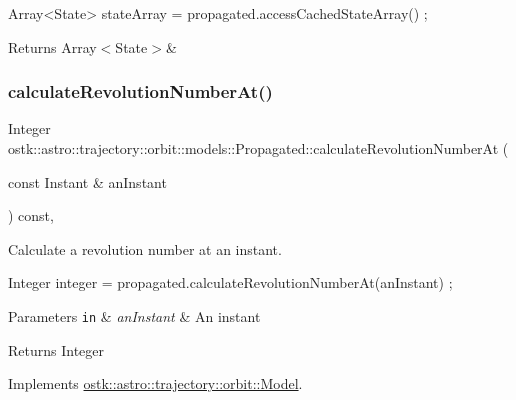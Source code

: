 \begin{DoxyCode}
Array<State> stateArray = propagated.accessCachedStateArray() ;
\end{DoxyCode}
 \begin{DoxyReturn}{Returns}
Array$<$\+State$>$\& 
\end{DoxyReturn}
\mbox{\label{classostk_1_1astro_1_1trajectory_1_1orbit_1_1models_1_1_propagated_a6360392c65494aa42aadff58ec58e49c}} 
\subsubsection{\texorpdfstring{calculate\+Revolution\+Number\+At()}{calculateRevolutionNumberAt()}}
{\footnotesize\ttfamily Integer ostk\+::astro\+::trajectory\+::orbit\+::models\+::\+Propagated\+::calculate\+Revolution\+Number\+At (\begin{DoxyParamCaption}\item[{const Instant \&}]{an\+Instant }\end{DoxyParamCaption}) const\hspace{0.3cm}{\ttfamily [override]}, {\ttfamily [virtual]}}



Calculate a revolution number at an instant. 


\begin{DoxyCode}
Integer integer = propagated.calculateRevolutionNumberAt(anInstant) ;
\end{DoxyCode}
 
\begin{DoxyParams}[1]{Parameters}
\mbox{\tt in}  & {\em an\+Instant} & An instant \\
\hline
\end{DoxyParams}
\begin{DoxyReturn}{Returns}
Integer 
\end{DoxyReturn}


Implements \hyperlink{classostk_1_1astro_1_1trajectory_1_1orbit_1_1_model_aeecf4cc22fa9c766801936c468cc52ac}{ostk\+::astro\+::trajectory\+::orbit\+::\+Model}.


